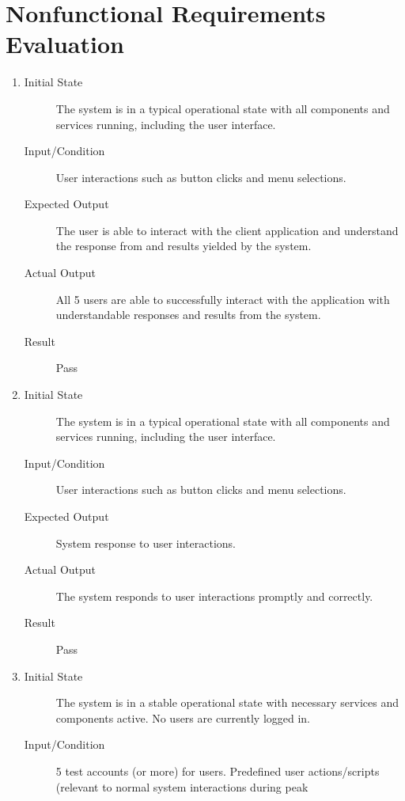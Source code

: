 \documentclass[12pt, titlepage]{article}
\begin{document}
\section{Nonfunctional Requirements Evaluation}

\begin{enumerate}[NFR-T1]
  \item \label{NFRT1}
    \begin{description}
    \item[Initial State] The system is in a typical operational state with all
      components and services running, including the user interface.
    \item[Input/Condition] User interactions such as button clicks and menu
      selections.
    \item[Expected Output] The user is able to interact with the client application and
      understand the response from and results yielded by the system.
    \item[Actual Output] All 5 users are able to successfully interact with the application 
    with understandable responses and results from the system.
    \item[Result] Pass
    \end{description}
  \item \label{NFRT2}
    \begin{description}
    \item[Initial State] The system is in a typical operational state with all
      components and services running, including the user interface.
    \item[Input/Condition] User interactions such as button clicks and menu
      selections.
    \item[Expected Output] System response to user interactions.
    \item[Actual Output] The system responds to user interactions promptly and correctly.
    \item[Result] Pass 
    \end{description}
  \item \label{NFRT3}
    \begin{description}
    \item[Initial State] The system is in a stable operational state with necessary
      services and components active. No users are currently logged in.
    \item[Input/Condition] 5 test accounts (or more) for users. Predefined user
      actions/scripts (relevant to normal system interactions during peak

\end{description}
\end{enumerate}
\end{document}
